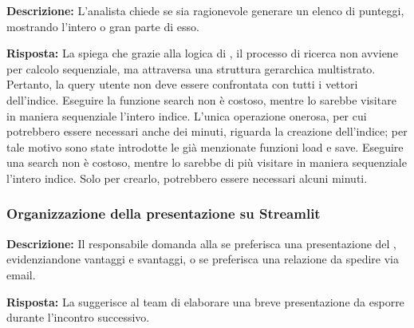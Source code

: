 \textbf{Descrizione:} L'analista chiede se sia ragionevole generare un elenco di punteggi, mostrando l'intero  o gran parte di esso.

\textbf{Risposta:} La  spiega che grazie alla logica di , il processo di ricerca non avviene per calcolo sequenziale, ma attraversa una struttura gerarchica multistrato. Pertanto, la query utente non deve essere confrontata con tutti i vettori dell'indice. 
Eseguire la funzione search non è costoso, mentre lo sarebbe visitare in maniera sequenziale l'intero indice. 
L'unica operazione onerosa, per cui potrebbero essere necessari anche dei minuti, riguarda la creazione dell'indice; per tale motivo sono state introdotte le già menzionate funzioni load e save.
Eseguire una search non è costoso, mentre lo sarebbe di più visitare in maniera sequenziale l'intero indice. 
Solo per crearlo, potrebbero essere necessari alcuni minuti.

\subsubsection{Organizzazione della presentazione su Streamlit}

\textbf{Descrizione:} Il responsabile domanda alla  se preferisca una presentazione del  , evidenziandone vantaggi e svantaggi, o se preferisca una relazione da spedire via email.

\textbf{Risposta:} La  suggerisce al team di elaborare una breve presentazione da esporre durante l'incontro successivo.